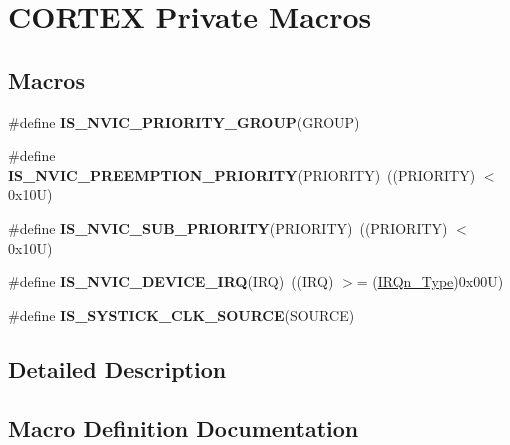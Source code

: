 \hypertarget{group___c_o_r_t_e_x___private___macros}{}\section{C\+O\+R\+T\+EX Private Macros}
\label{group___c_o_r_t_e_x___private___macros}
\subsection*{Macros}
\begin{DoxyCompactItemize}
\item 
\#define {\bfseries I\+S\+\_\+\+N\+V\+I\+C\+\_\+\+P\+R\+I\+O\+R\+I\+T\+Y\+\_\+\+G\+R\+O\+UP}(G\+R\+O\+UP)
\item 
\mbox{\label{group___c_o_r_t_e_x___private___macros_gaf30fd8f5960c2e28a772d8f16bb156dd}} 
\#define {\bfseries I\+S\+\_\+\+N\+V\+I\+C\+\_\+\+P\+R\+E\+E\+M\+P\+T\+I\+O\+N\+\_\+\+P\+R\+I\+O\+R\+I\+TY}(P\+R\+I\+O\+R\+I\+TY)~((P\+R\+I\+O\+R\+I\+TY) $<$ 0x10\+U)
\item 
\mbox{\label{group___c_o_r_t_e_x___private___macros_ga010705bc997dcff935b965b372cba61d}} 
\#define {\bfseries I\+S\+\_\+\+N\+V\+I\+C\+\_\+\+S\+U\+B\+\_\+\+P\+R\+I\+O\+R\+I\+TY}(P\+R\+I\+O\+R\+I\+TY)~((P\+R\+I\+O\+R\+I\+TY) $<$ 0x10\+U)
\item 
\mbox{\label{group___c_o_r_t_e_x___private___macros_ga9b8dcac4ed8e88c14d9bb04e369dad6a}} 
\#define {\bfseries I\+S\+\_\+\+N\+V\+I\+C\+\_\+\+D\+E\+V\+I\+C\+E\+\_\+\+I\+RQ}(I\+RQ)~((I\+RQ) $>$= (\hyperlink{group___peripheral__interrupt__number__definition_ga7e1129cd8a196f4284d41db3e82ad5c8}{I\+R\+Qn\+\_\+\+Type})0x00\+U)
\item 
\#define {\bfseries I\+S\+\_\+\+S\+Y\+S\+T\+I\+C\+K\+\_\+\+C\+L\+K\+\_\+\+S\+O\+U\+R\+CE}(S\+O\+U\+R\+CE)
\end{DoxyCompactItemize}


\subsection{Detailed Description}


\subsection{Macro Definition Documentation}
\mbox{\label{group___c_o_r_t_e_x___private___macros_ga6569304a39fe4f91bd59b6a586c8ede9}} 
